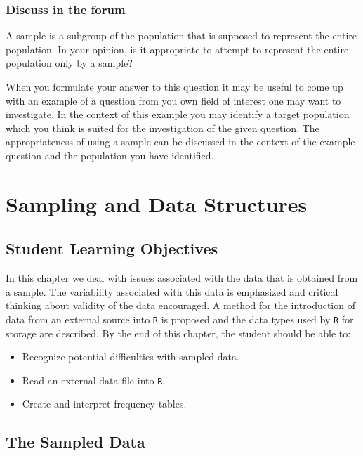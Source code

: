 \documentclass[]{krantz}
\providecommand{\tightlist}{%
  \setlength{\itemsep}{0pt}\setlength{\parskip}{0pt}}
\theoremstyle{definition}
\theoremstyle{definition}
\theoremstyle{definition}
\theoremstyle{remark}
\begin{document}
\subsection*{Discuss in the forum}\label{discuss-in-the-forum}


A sample is a subgroup of the population that is supposed to represent
the entire population. In your opinion, is it appropriate to attempt to
represent the entire population only by a sample?

When you formulate your answer to this question it may be useful to come
up with an example of a question from you own field of interest one may
want to investigate. In the context of this example you may identify a
target population which you think is suited for the investigation of the
given question. The appropriateness of using a sample can be discussed
in the context of the example question and the population you have
identified.

\chapter{Sampling and Data Structures}\label{ChapData}

\section{Student Learning
Objectives}\label{student-learning-objectives-1}

In this chapter we deal with issues associated with the data that is
obtained from a sample. The variability associated with this data is
emphasized and critical thinking about validity of the data encouraged.
A method for the introduction of data from an external source into
\texttt{R} is proposed and the data types used by \texttt{R} for storage
are described. By the end of this chapter, the student should be able
to:

\begin{itemize}
\tightlist
\item
  Recognize potential difficulties with sampled data.
\item
  Read an external data file into \texttt{R}.
\item
  Create and interpret frequency tables.
\end{itemize}

\section{The Sampled Data}\label{the-sampled-data}
\end{document}

